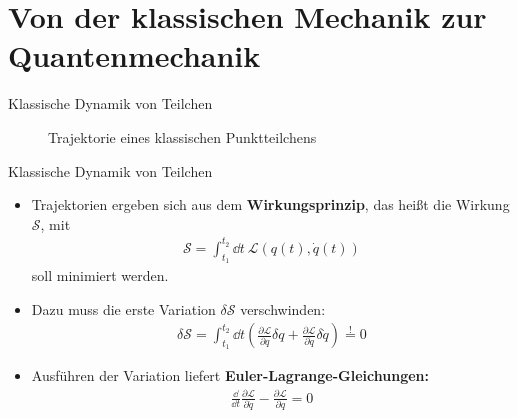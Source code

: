 \section{Von der klassischen Mechanik zur Quantenmechanik}
\begin{frame}{Klassische Dynamik von Teilchen}
\begin{figure}
\caption{Trajektorie eines klassischen Punktteilchens}
\end{figure}
\end{frame}

\begin{frame}{Klassische Dynamik von Teilchen}
\begin{itemize}
	\item Trajektorien ergeben sich aus dem \textbf{Wirkungsprinzip}, das heißt die Wirkung $\mathcal{S}$, mit
	\begin{align*}
	\mathcal{S} = \int_{t_1}^{t_2} \dd t \ \mathcal{L}(q(t),\dot{q}(t)) 
	\end{align*}
	soll minimiert werden.
	\item Dazu muss die erste Variation $\delta\mathcal{S}$ verschwinden:
	\begin{align*}
		\delta \mathcal{S} = \int_{t_1}^{t_2} \dd t \left(\frac{\partial \mathcal{L}}{\partial q} \delta q + \frac{\partial \mathcal{L}}{\partial \dot{q}} \delta \dot{q}\right) \overset{!}{ = } 0
	\end{align*}
	\item Ausführen der Variation liefert \textbf{Euler-Lagrange-Gleichungen:} 
	\begin{align*}
		\frac{\dd}{\dd t}\frac{\partial \mathcal{L}}{\partial \dot{q}} - \frac{\partial \mathcal{L}}{\partial q} = 0
	\end{align*}
\end{itemize}
\end{frame}

